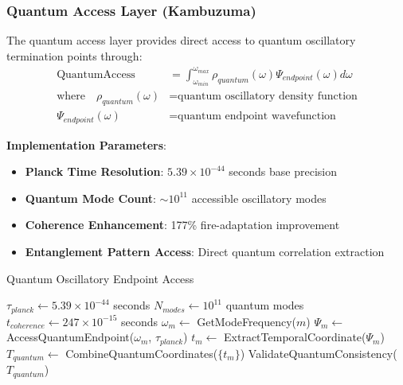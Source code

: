 ﻿\documentclass[11pt,a4paper]{article}
\begin{document}
\subsubsection{Quantum Access Layer (Kambuzuma)}

\begin{definition}
The quantum access layer provides direct access to quantum oscillatory termination points through:
\begin{align}
\text{QuantumAccess} &= \int_{\omega_{min}}^{\omega_{max}} \rho_{quantum}(\omega) \Psi_{endpoint}(\omega) d\omega \\
\text{where} \quad \rho_{quantum}(\omega) &= \text{quantum oscillatory density function} \\
\Psi_{endpoint}(\omega) &= \text{quantum endpoint wavefunction}
\end{align}
\end{definition}

\textbf{Implementation Parameters}:
\begin{itemize}
\item \textbf{Planck Time Resolution}: $5.39 \times 10^{-44}$ seconds base precision
\item \textbf{Quantum Mode Count}: $\sim 10^{11}$ accessible oscillatory modes
\item \textbf{Coherence Enhancement}: 177\% fire-adaptation improvement
\item \textbf{Entanglement Pattern Access}: Direct quantum correlation extraction
\end{itemize}

\begin{algorithm}
\caption{Quantum Oscillatory Endpoint Access}
\begin{algorithmic}
    \State $\tau_{planck} \leftarrow 5.39 \times 10^{-44}$ seconds
    \State $N_{modes} \leftarrow 10^{11}$ quantum modes
    \State $t_{coherence} \leftarrow 247 \times 10^{-15}$ seconds
        \State $\omega_m \leftarrow$ GetModeFrequency($m$)
        \State $\Psi_m \leftarrow$ AccessQuantumEndpoint($\omega_m$, $\tau_{planck}$)
        \State $t_m \leftarrow$ ExtractTemporalCoordinate($\Psi_m$)
    \EndFor
    \State $T_{quantum} \leftarrow$ CombineQuantumCoordinates($\{t_m\}$)
    \State \Return ValidateQuantumConsistency($T_{quantum}$)
\EndProcedure
\end{algorithmic}
\end{algorithm}
\end{document}
